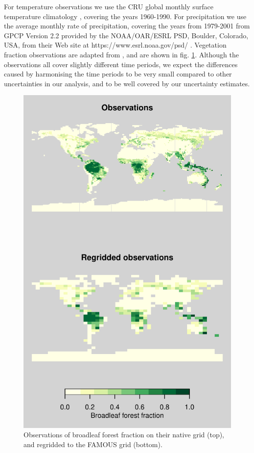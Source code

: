 \documentclass[gmd, manuscript]{copernicus}
\begin{document}
For temperature observations we use the CRU global monthly surface temperature climatology \citep{jones1999face}, covering the years 1960-1990. For precipitation we use the average monthly rate of precipitation, covering the years from 1979-2001 from GPCP Version 2.2 provided by the NOAA/OAR/ESRL PSD, Boulder, Colorado, USA, from their Web site at https://www.esrl.noaa.gov/psd/ \citep{Adler2003}. Vegetation fraction observations are adapted from \cite{loveland2000landcover}, and are shown in fig. \ref{fig:map_comparison}. Although the observations all cover slightly different time periods, we expect the differences caused by harmonising the time periods to be very small compared to other uncertainties in our analysis, and to be well covered by our uncertainty estimates.

\begin{figure}[t]
\includegraphics[width=12cm]{../graphics/map_comparison.pdf}
\caption{Observations of broadleaf forest fraction on their native grid (top), and regridded to the FAMOUS grid (bottom).}
\label{fig:map_comparison}
\end{figure}
\end{document}
